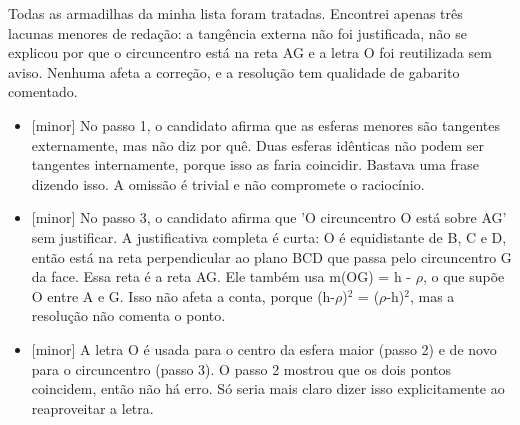 \documentclass{article}%
\begin{document}
Todas as armadilhas da minha lista foram tratadas. Encontrei apenas três lacunas menores de redação: a tangência externa não foi justificada, não se explicou por que o circuncentro está na reta AG e a letra O foi reutilizada sem aviso. Nenhuma afeta a correção, e a resolução tem qualidade de gabarito comentado.%
\begin{itemize}%
\item%
{[}minor{]} No passo 1, o candidato afirma que as esferas menores são tangentes externamente, mas não diz por quê. Duas esferas idênticas não podem ser tangentes internamente, porque isso as faria coincidir. Bastava uma frase dizendo isso. A omissão é trivial e não compromete o raciocínio.%
\item%
{[}minor{]} No passo 3, o candidato afirma que 'O circuncentro O está sobre AG' sem justificar. A justificativa completa é curta: O é equidistante de B, C e D, então está na reta perpendicular ao plano BCD que passa pelo circuncentro G da face. Essa reta é a reta AG. Ele também usa m(OG) = h - $\rho$, o que supõe O entre A e G. Isso não afeta a conta, porque (h-$\rho$)$^2$ = ($\rho$-h)$^2$, mas a resolução não comenta o ponto.%
\item%
{[}minor{]} A letra O é usada para o centro da esfera maior (passo 2) e de novo para o circuncentro (passo 3). O passo 2 mostrou que os dois pontos coincidem, então não há erro. Só seria mais claro dizer isso explicitamente ao reaproveitar a letra.%
\end{itemize}%
\end{document}
